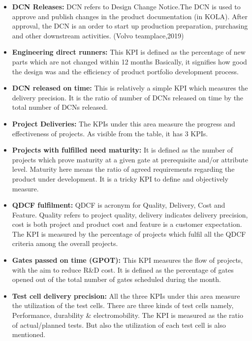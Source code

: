 \begin{itemize}

     \item \textbf{DCN Releases:}
    DCN refers to Design Change Notice.The DCN is used to approve and publish changes in the product documentation (in KOLA). After approval, the DCN is an order to start up production preparation, purchasing and other downstream activities. (Volvo teamplace,2019)

     \item \textbf{Engineering direct runners:}
    This KPI is defined as the percentage of new parts which are not changed within 12 months Basically, it signifies how good the design was and the efficiency of product portfolio development process.

     \item \textbf{ DCN released on time:}
    This is relatively a simple KPI which measures the delivery precision. It is the ratio of number of DCNs released on time by the total number of DCNs released.

     \item \textbf{Project Deliveries:}
    The KPIs under this area measure the progress and effectiveness of projects. As visible from the table, it has 3 KPIs.

     \item \textbf{Projects with fulfilled need maturity:}
  It is defined as the number of projects which prove maturity at a given gate at prerequisite and/or attribute level. Maturity here means the ratio of agreed requirements regarding the product under development. It is a tricky KPI to define and objectively measure.

     \item \textbf{QDCF fulfilment:}
    QDCF is acronym for Quality, Delivery, Cost and Feature. Quality refers to project quality, delivery indicates delivery precision, cost is both project and product cost and feature is a customer expectation. The KPI is measured by the percentage of projects which fulfil all the QDCF criteria among the overall projects.

     \item \textbf{Gates passed on time (GPOT):}
    This KPI measures the flow of projects, with the aim to reduce R&D cost. It is defined as the percentage of gates opened out of the total number of gates scheduled during the month.

     \item \textbf{Test cell delivery precision:}
    All the three KPIs under this area measure the utilization of the test cells. There are three kinds of test cells namely, Performance, durability & electromobility. The KPI is measured as the ratio of actual/planned tests. But also the utilization of each test cell is also mentioned.\\
\end{itemize}


